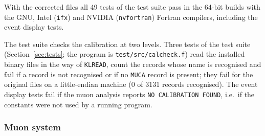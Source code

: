 With the corrected files all 49 tests of the test suite pass in the 64-bit builds with the GNU, Intel (\texttt{ifx}) and NVIDIA (\texttt{nvfortran}) Fortran compilers, including the event display tests.

The test suite checks the calibration at two levels. Three tests of the test suite (Section~\ref{sec:tests}; the program is \texttt{test/\allowbreak{}src/\allowbreak{}calcheck.f}) read the
installed binary files in the way of \texttt{KLREAD}, count the records whose name is recognised and fail if
a record is not recognised or if no \texttt{MUCA} record is present; they fail for the original files on a
little-endian machine (0 of 3131 records recognised). The event display tests fail if the muon
analysis reports \texttt{NO CALIBRATION FOUND}, i.e.\ if the constants were not used by a running program.

\subsubsection{Muon system}

